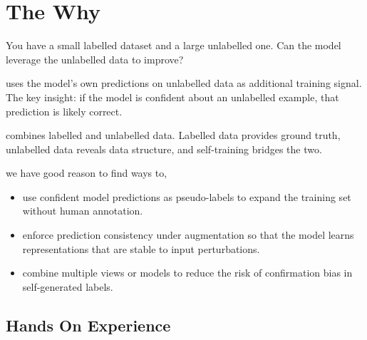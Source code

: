 
\section{The Why}


You have a small labelled dataset and a large unlabelled one. Can the model leverage the unlabelled data to improve?

 uses the model's own predictions on unlabelled data as additional training signal. The key insight: if the model is confident about an unlabelled example, that prediction is likely correct.

 combines labelled and unlabelled data. Labelled data provides ground truth, unlabelled data reveals data structure, and self-training bridges the two.

 we have good reason to find ways to,
\begin{itemize}
    \item use confident model predictions as pseudo-labels to expand the training set without human annotation.
    \item enforce prediction consistency under augmentation so that the model learns representations that are stable to input perturbations.
    \item combine multiple views or models to reduce the risk of confirmation bias in self-generated labels.
\end{itemize}

\subsection{Hands On Experience}

